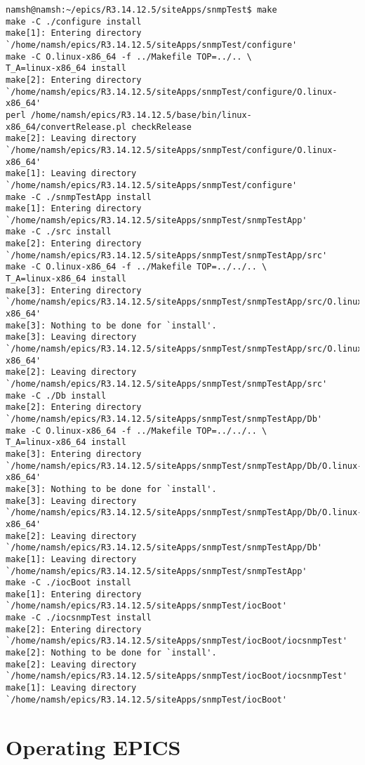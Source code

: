 \documentclass[11pt
  , a4paper
  , article
  , oneside
]{memoir}
\begin{document}
\begin{lstlisting}[style=termstyle]
namsh@namsh:~/epics/R3.14.12.5/siteApps/snmpTest$ make
make -C ./configure install 
make[1]: Entering directory `/home/namsh/epics/R3.14.12.5/siteApps/snmpTest/configure'
make -C O.linux-x86_64 -f ../Makefile TOP=../.. \
T_A=linux-x86_64 install
make[2]: Entering directory `/home/namsh/epics/R3.14.12.5/siteApps/snmpTest/configure/O.linux-x86_64'
perl /home/namsh/epics/R3.14.12.5/base/bin/linux-x86_64/convertRelease.pl checkRelease
make[2]: Leaving directory `/home/namsh/epics/R3.14.12.5/siteApps/snmpTest/configure/O.linux-x86_64'
make[1]: Leaving directory `/home/namsh/epics/R3.14.12.5/siteApps/snmpTest/configure'
make -C ./snmpTestApp install 
make[1]: Entering directory `/home/namsh/epics/R3.14.12.5/siteApps/snmpTest/snmpTestApp'
make -C ./src install 
make[2]: Entering directory `/home/namsh/epics/R3.14.12.5/siteApps/snmpTest/snmpTestApp/src'
make -C O.linux-x86_64 -f ../Makefile TOP=../../.. \
T_A=linux-x86_64 install
make[3]: Entering directory `/home/namsh/epics/R3.14.12.5/siteApps/snmpTest/snmpTestApp/src/O.linux-x86_64'
make[3]: Nothing to be done for `install'.
make[3]: Leaving directory `/home/namsh/epics/R3.14.12.5/siteApps/snmpTest/snmpTestApp/src/O.linux-x86_64'
make[2]: Leaving directory `/home/namsh/epics/R3.14.12.5/siteApps/snmpTest/snmpTestApp/src'
make -C ./Db install 
make[2]: Entering directory `/home/namsh/epics/R3.14.12.5/siteApps/snmpTest/snmpTestApp/Db'
make -C O.linux-x86_64 -f ../Makefile TOP=../../.. \
T_A=linux-x86_64 install
make[3]: Entering directory `/home/namsh/epics/R3.14.12.5/siteApps/snmpTest/snmpTestApp/Db/O.linux-x86_64'
make[3]: Nothing to be done for `install'.
make[3]: Leaving directory `/home/namsh/epics/R3.14.12.5/siteApps/snmpTest/snmpTestApp/Db/O.linux-x86_64'
make[2]: Leaving directory `/home/namsh/epics/R3.14.12.5/siteApps/snmpTest/snmpTestApp/Db'
make[1]: Leaving directory `/home/namsh/epics/R3.14.12.5/siteApps/snmpTest/snmpTestApp'
make -C ./iocBoot install 
make[1]: Entering directory `/home/namsh/epics/R3.14.12.5/siteApps/snmpTest/iocBoot'
make -C ./iocsnmpTest install 
make[2]: Entering directory `/home/namsh/epics/R3.14.12.5/siteApps/snmpTest/iocBoot/iocsnmpTest'
make[2]: Nothing to be done for `install'.
make[2]: Leaving directory `/home/namsh/epics/R3.14.12.5/siteApps/snmpTest/iocBoot/iocsnmpTest'
make[1]: Leaving directory `/home/namsh/epics/R3.14.12.5/siteApps/snmpTest/iocBoot'
\end{lstlisting}
\section{Operating EPICS}
\end{document}
